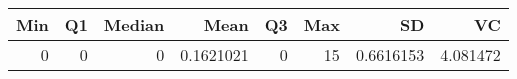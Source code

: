 
\begin{tabular}[t]{rrrrrrrr}
\toprule
Min & Q1 & Median & Mean & Q3 & Max & SD & VC\\
\midrule
0 & 0 & 0 & 0.1621021 & 0 & 15 & 0.6616153 & 4.081472\\
\bottomrule
\end{tabular}